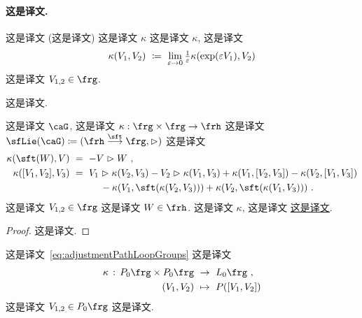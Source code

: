 \documentclass[
    affil-it, %
    auth-lg, %
    british, %
    compression, %
    contents, %
    custom-packages={}, %
    references={bigone}, %
]{lib/preprint}
\begin{document}
\begin{body}
        \paragraph{这是译文.}  这是译文 (这是译文) 这是译文 $\kappa$ 这是译文 $\kappa$, 这是译文         \begin{equation}\label{eq:linearisedKappa}
            \kappa(V_1,V_2)\ \coloneqq\ \lim_{\eps\to0}\tfrac1\eps\kappa(\exp(\eps V_1),V_2)
        \end{equation}  这是译文 $V_{1,2}\in\frg$.
        
这是译文.
        \begin{proposition}
            这是译文 $\caG$, 这是译文 $\kappa:\frg\times \frg\rightarrow \frh$ 这是译文 $\sfLie(\caG)\coloneqq(\frh\overset{\sft}{\longrightarrow}\frg,\acton)$ 这是译文 
            \begin{equation}
                \begin{aligned}            
                    \kappa(\sft(W),V)\ &=\ -V\acton W~,
                    \\
                    \kappa([V_1,V_2],V_3)\ &=\ V_1\acton \kappa(V_2,V_3)-V_2\acton \kappa(V_1,V_3)+\kappa(V_1,[V_2,V_3])-\kappa(V_2,[V_1,V_3])
                    \\
                    &\hspace{1cm}-\kappa(V_1,\sft(\kappa(V_2,V_3)))+\kappa(V_2,\sft(\kappa(V_1,V_3)))~.
                \end{aligned}
			\end{equation}  这是译文 $V_{1,2}\in\frg$ 这是译文 $W\in\frh$. 这是译文 $\kappa$, 这是译文 \uline{这是译文}.
        \end{proposition}

        \begin{proof}
            这是译文.
        \end{proof}
        
        \begin{example}
            这是译文~\eqref{eq:adjustmentPathLoopGroups} 这是译文             \begin{equation}\label{eq:adjustmentPathLoopAlgebras}
                \begin{aligned}
                    \kappa\,:\,P_0\frg\times P_0\frg\ &\rightarrow\ L_0\frg~,
                    \\
                    (V_1,V_2)\ &\mapsto\ P([V_1,V_2])
                \end{aligned}
            \end{equation}  这是译文 $V_{1,2}\in P_0\frg$ 这是译文.
        \end{example}


\end{body}
\end{document}
